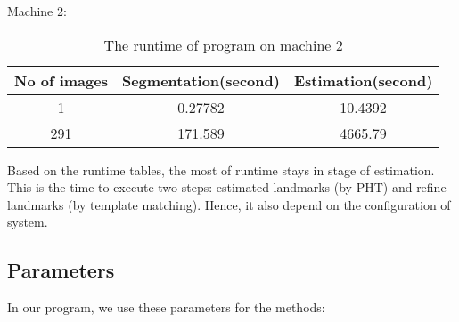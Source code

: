 Machine 2:
\begin{table}[h]
	\centering
	\begin{tabular}{|c|c|c|}
		\hline
		No of images & Segmentation(second) & Estimation(second) \\ \hline
		1 & 0.27782 & 10.4392   \\ \hline
		291 & 171.589 & 4665.79   \\ \hline
	\end{tabular}
	\caption{The runtime of program on machine 2}
	\label{table_runtime2}
\end{table}
Based on the runtime tables, the most of runtime stays in stage of estimation. This is the time to execute two steps: estimated landmarks (by PHT) and refine landmarks (by template matching). Hence, it also depend on the configuration of system.
\subsection{Parameters}
In our program, we use these parameters for the methods:
